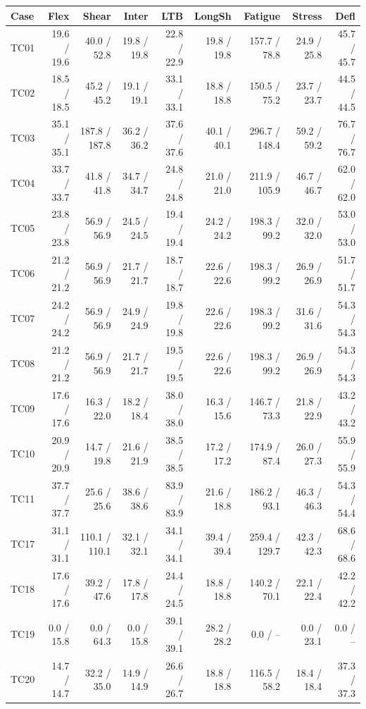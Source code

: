 \begin{tabular}{@{}lrrrrrrrr@{}}
\toprule
\textbf{Case} & \textbf{Flex} & \textbf{Shear} & \textbf{Inter} & \textbf{LTB} & \textbf{LongSh} & \textbf{Fatigue} & \textbf{Stress} & \textbf{Defl} \\
\midrule
TC01 & 19.6 / 19.6 & 40.0 / 52.8 & 19.8 / 19.8 & 22.8 / 22.9 & 19.8 / 19.8 & 157.7 / 78.8 & 24.9 / 25.8 & 45.7 / 45.7 \\
TC02 & 18.5 / 18.5 & 45.2 / 45.2 & 19.1 / 19.1 & 33.1 / 33.1 & 18.8 / 18.8 & 150.5 / 75.2 & 23.7 / 23.7 & 44.5 / 44.5 \\
TC03 & 35.1 / 35.1 & 187.8 / 187.8 & 36.2 / 36.2 & 37.6 / 37.6 & 40.1 / 40.1 & 296.7 / 148.4 & 59.2 / 59.2 & 76.7 / 76.7 \\
TC04 & 33.7 / 33.7 & 41.8 / 41.8 & 34.7 / 34.7 & 24.8 / 24.8 & 21.0 / 21.0 & 211.9 / 105.9 & 46.7 / 46.7 & 62.0 / 62.0 \\
TC05 & 23.8 / 23.8 & 56.9 / 56.9 & 24.5 / 24.5 & 19.4 / 19.4 & 24.2 / 24.2 & 198.3 / 99.2 & 32.0 / 32.0 & 53.0 / 53.0 \\
TC06 & 21.2 / 21.2 & 56.9 / 56.9 & 21.7 / 21.7 & 18.7 / 18.7 & 22.6 / 22.6 & 198.3 / 99.2 & 26.9 / 26.9 & 51.7 / 51.7 \\
TC07 & 24.2 / 24.2 & 56.9 / 56.9 & 24.9 / 24.9 & 19.8 / 19.8 & 22.6 / 22.6 & 198.3 / 99.2 & 31.6 / 31.6 & 54.3 / 54.3 \\
TC08 & 21.2 / 21.2 & 56.9 / 56.9 & 21.7 / 21.7 & 19.5 / 19.5 & 22.6 / 22.6 & 198.3 / 99.2 & 26.9 / 26.9 & 54.3 / 54.3 \\
TC09 & 17.6 / 17.6 & 16.3 / 22.0 & 18.2 / 18.4 & 38.0 / 38.0 & 16.3 / 15.6 & 146.7 / 73.3 & 21.8 / 22.9 & 43.2 / 43.2 \\
TC10 & 20.9 / 20.9 & 14.7 / 19.8 & 21.6 / 21.9 & 38.5 / 38.5 & 17.2 / 17.2 & 174.9 / 87.4 & 26.0 / 27.3 & 55.9 / 55.9 \\
TC11 & 37.7 / 37.7 & 25.6 / 25.6 & 38.6 / 38.6 & 83.9 / 83.9 & 21.6 / 18.8 & 186.2 / 93.1 & 46.3 / 46.3 & 54.3 / 54.4 \\
TC17 & 31.1 / 31.1 & 110.1 / 110.1 & 32.1 / 32.1 & 34.1 / 34.1 & 39.4 / 39.4 & 259.4 / 129.7 & 42.3 / 42.3 & 68.6 / 68.6 \\
TC18 & 17.6 / 17.6 & 39.2 / 47.6 & 17.8 / 17.8 & 24.4 / 24.5 & 18.8 / 18.8 & 140.2 / 70.1 & 22.1 / 22.4 & 42.2 / 42.2 \\
TC19 & 0.0 / 15.8 & 0.0 / 64.3 & 0.0 / 15.8 & 39.1 / 39.1 & 28.2 / 28.2 & 0.0 / -- & 0.0 / 23.1 & 0.0 / -- \\
TC20 & 14.7 / 14.7 & 32.2 / 35.0 & 14.9 / 14.9 & 26.6 / 26.7 & 18.8 / 18.8 & 116.5 / 58.2 & 18.4 / 18.4 & 37.3 / 37.3 \\
\bottomrule
\end{tabular}
